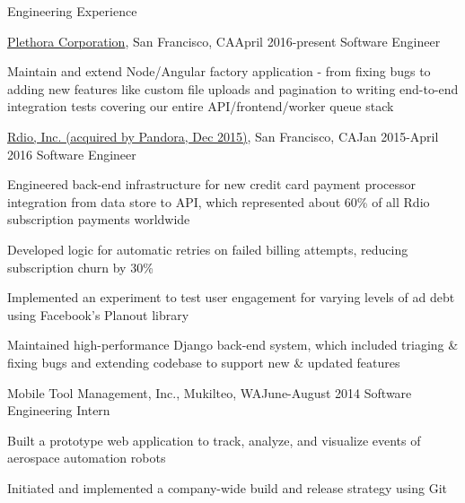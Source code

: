 \documentclass{resume} %
\begin{document}

\begin{rSection}{Engineering Experience}

\begin{rSubsection}{\href{https://www.plethora.com/}{Plethora Corporation}, San
Francisco, CA}{April 2016-present} {Software Engineer}

\item Maintain and extend Node/Angular factory application - from fixing bugs to
adding new features like custom file uploads and pagination to writing
end-to-end integration tests covering
our entire API/frontend/worker queue stack

\end{rSubsection}

\begin{rSubsection}{\href{https://www.pandora.com/}{Rdio, Inc. (acquired by
Pandora, Dec 2015)}, San Francisco, CA}{Jan 2015-April 2016} {Software Engineer}

\item Engineered back-end infrastructure for new credit card payment processor
integration from data store to API, which represented about 60\% of all Rdio
subscription payments worldwide
\item Developed logic for automatic retries on failed billing attempts, reducing
subscription churn by 30\%
\item Implemented an experiment to test user engagement for varying levels of ad
debt using Facebook's Planout library
\item Maintained high-performance Django back-end system, which included
triaging \& fixing bugs and extending codebase to support new \& updated
features
\end{rSubsection}

\begin{rSubsection}{Mobile Tool Management, Inc., Mukilteo, WA}{June-August
2014} {Software Engineering Intern}

\item Built a prototype web application to track, analyze, and visualize events
of aerospace automation robots
\item Initiated and implemented a company-wide build and release strategy using
Git
\end{rSubsection}


\end{rSection}
\end{document}
